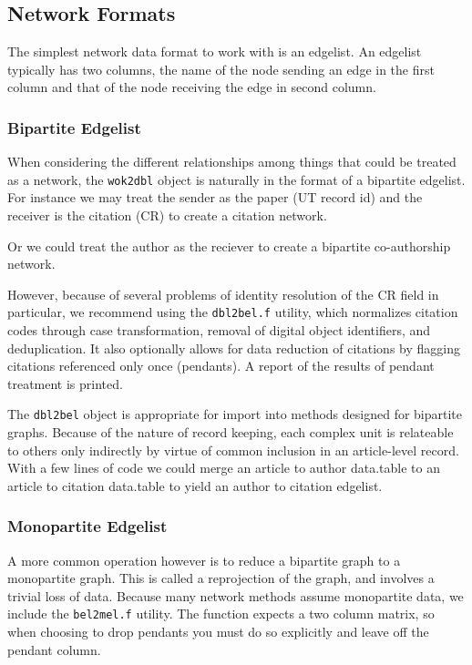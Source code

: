 \documentclass [PhD] {uclathes}
\begin{document}
\subsection{Network Formats}\label{network-formats}

The simplest network data format to work with is an edgelist. An
edgelist typically has two columns, the name of the node sending an edge
in the first column and that of the node receiving the edge in second
column.

\subsubsection{Bipartite Edgelist}\label{bipartite-edgelist}

When considering the different relationships among things that could be
treated as a network, the \texttt{wok2dbl} object is naturally in the
format of a bipartite edgelist. For instance we may treat the sender as
the paper (UT record id) and the receiver is the citation (CR) to create
a citation network.

Or we could treat the author as the reciever to create a bipartite
co-authorship network.

However, because of several problems of identity resolution of the CR
field in particular, we recommend using the \texttt{dbl2bel.f} utility,
which normalizes citation codes through case transformation, removal of
digital object identifiers, and deduplication. It also optionally allows
for data reduction of citations by flagging citations referenced only
once (pendants). A report of the results of pendant treatment is
printed.

The \texttt{dbl2bel} object is appropriate for import into methods
designed for bipartite graphs. Because of the nature of record keeping,
each complex unit is relateable to others only indirectly by virtue of
common inclusion in an article-level record. With a few lines of code we
could merge an article to author data.table to an article to citation
data.table to yield an author to citation edgelist.

\subsubsection{Monopartite Edgelist}\label{monopartite-edgelist}

A more common operation however is to reduce a bipartite graph to a
monopartite graph. This is called a reprojection of the graph, and
involves a trivial loss of data. Because many network methods assume
monopartite data, we include the \texttt{bel2mel.f} utility. The
function expects a two column matrix, so when choosing to drop pendants
you must do so explicitly and leave off the pendant column.
\end{document}
